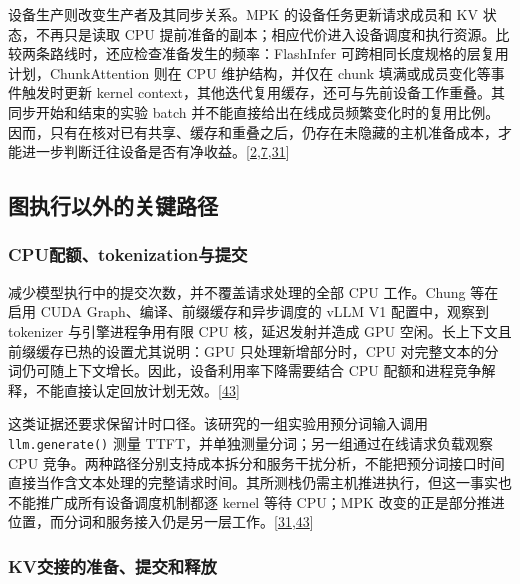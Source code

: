 \documentclass[
  UTF8,
  zihao=5]{ctexart}
\begin{document}
设备生产则改变生产者及其同步关系。MPK 的设备任务更新请求成员和 KV
状态，不再只是读取 CPU
提前准备的副本；相应代价进入设备调度和执行资源。比较两条路线时，还应检查准备发生的频率：FlashInfer
可跨相同长度规格的层复用计划，ChunkAttention 则在 CPU 维护结构，并仅在
chunk 填满或成员变化等事件触发时更新 kernel
context，其他迭代复用缓存，还可与先前设备工作重叠。其同步开始和结束的实验
batch
并不能直接给出在线成员频繁变化时的复用比例。因而，只有在核对已有共享、缓存和重叠之后，仍存在未隐藏的主机准备成本，才能进一步判断迁往设备是否有净收益。{[}\protect\hyperlink{ref-ye2025flashinfer}{2},\protect\hyperlink{ref-ye2024chunkattention}{7},\protect\hyperlink{ref-cheng2026mpk}{31}{]}

\hypertarget{ux56feux6267ux884cux4ee5ux5916ux7684ux5173ux952eux8defux5f84}{%
\subsection{图执行以外的关键路径}\label{ux56feux6267ux884cux4ee5ux5916ux7684ux5173ux952eux8defux5f84}}

\hypertarget{cpuux914dux989dtokenizationux4e0eux63d0ux4ea4}{%
\subsubsection{CPU配额、tokenization与提交}\label{cpuux914dux989dtokenizationux4e0eux63d0ux4ea4}}

减少模型执行中的提交次数，并不覆盖请求处理的全部 CPU 工作。Chung
等在启用 CUDA Graph、编译、前缀缓存和异步调度的 vLLM V1 配置中，观察到
tokenizer 与引擎进程争用有限 CPU 核，延迟发射并造成 GPU
空闲。长上下文且前缀缓存已热的设置尤其说明：GPU 只处理新增部分时，CPU
对完整文本的分词仍可随上下文增长。因此，设备利用率下降需要结合 CPU
配额和进程竞争解释，不能直接认定回放计划无效。{[}\protect\hyperlink{ref-chung2026cpu}{43}{]}

这类证据还要求保留计时口径。该研究的一组实验用预分词输入调用
\texttt{llm.generate()} 测量
TTFT，并单独测量分词；另一组通过在线请求负载观察 CPU
竞争。两种路径分别支持成本拆分和服务干扰分析，不能把预分词接口时间直接当作含文本处理的完整请求时间。其所测栈仍需主机推进执行，但这一事实也不能推广成所有设备调度机制都逐
kernel 等待 CPU；MPK
改变的正是部分推进位置，而分词和服务接入仍是另一层工作。{[}\protect\hyperlink{ref-cheng2026mpk}{31},\protect\hyperlink{ref-chung2026cpu}{43}{]}

\hypertarget{kvux4ea4ux63a5ux7684ux51c6ux5907ux63d0ux4ea4ux548cux91caux653e}{%
\subsubsection{KV交接的准备、提交和释放}\label{kvux4ea4ux63a5ux7684ux51c6ux5907ux63d0ux4ea4ux548cux91caux653e}}
\end{document}
